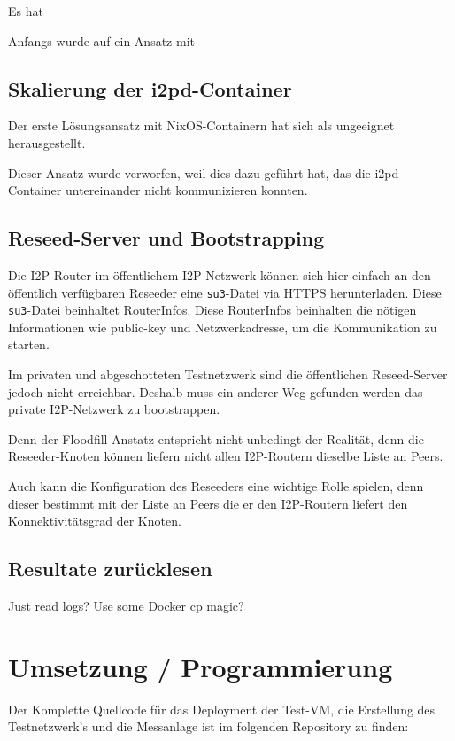 Es hat 

Anfangs wurde auf ein Ansatz mit 


\subsection{Skalierung der i2pd-Container}

Der erste Lösungsansatz mit NixOS-Containern hat sich als ungeeignet herausgestellt. 

Dieser Ansatz wurde verworfen, weil dies dazu geführt hat, das die i2pd-Container untereinander nicht kommunizieren konnten.

\subsection{Reseed-Server und Bootstrapping}

Die I2P-Router im öffentlichem I2P-Netzwerk können sich hier einfach an den öffentlich verfügbaren Reseeder eine \lstinline|su3|-Datei via HTTPS herunterladen.
Diese \lstinline|su3|-Datei beinhaltet RouterInfos. 
Diese RouterInfos beinhalten die nötigen Informationen wie public-key und Netzwerkadresse, um die Kommunikation zu starten.

Im privaten und abgeschotteten Testnetzwerk sind die öffentlichen Reseed-Server jedoch nicht erreichbar.
Deshalb muss ein anderer Weg gefunden werden das private I2P-Netzwerk zu bootstrappen.

Denn der Floodfill-Anstatz entspricht nicht unbedingt der Realität, denn die Reseeder-Knoten können liefern nicht allen I2P-Routern dieselbe Liste an Peers.

Auch kann die Konfiguration des Reseeders eine wichtige Rolle spielen, denn dieser bestimmt mit der Liste an Peers die er den I2P-Routern liefert den Konnektivitätsgrad der Knoten.

\subsection{Resultate zurücklesen}

Just read logs? Use some Docker cp magic?

\section{Umsetzung / Programmierung}

Der Komplette Quellcode für das Deployment der Test-VM, die Erstellung des Testnetzwerk's und die Messanlage ist im folgenden Repository zu finden:

